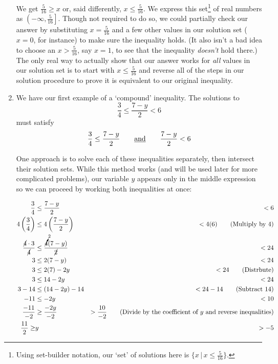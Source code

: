 \begin{ex}
\begin{enumerate}
We get $\frac{5}{16} \geq x$ or, said differently,  $x \leq \frac{5}{16}$.  We express this set\footnote{Using set-builder notation, our `set' of solutions here is $\{ x \, | \, x \leq \frac{5}{16} \}$.} of real numbers as  $\left(-\infty, \frac{5}{16}\right]$. Though not required to do so, we could partially check our answer by substituting $x = \frac{5}{16}$ and a few other values in our solution set ($x =0$, for instance) to make sure the inequality holds.  (It also isn't a bad idea to choose an $x > \frac{5}{16}$, say $x = 1$, to see that the inequality \textit{doesn't} hold there.)  The only real way to actually show that our answer works for \textit{all} values in our solution set is to start with $x \leq \frac{5}{16}$ and reverse all of the steps in our solution procedure to prove it is equivalent to our original inequality.  

\item  We have our first example of a `compound' inequality.  The solutions to  \[ \dfrac{3}{4} \leq \dfrac{7-y}{2} < 6 \] must satisfy \[ \dfrac{3}{4} \leq \dfrac{7-y}{2} \qquad \text{\underline{and}} \qquad \dfrac{7-y}{2} < 6\]

One approach is to solve each of these inequalities separately, then intersect their solution sets.  While this method works (and will be used later for more complicated problems), our variable $y$ appears only in the middle expression so we can proceed by working both inequalities at once:

\begin{align*}
\dfrac{3}{4} & \leq \dfrac{7-y}{2} & < 6 \\
4\left(\dfrac{3}{4} \right) & \leq 4\left( \dfrac{7-y}{2}\right) & < 4(6) \tag{Multiply by $4$} \\
\dfrac{\cancel{4} \cdot 3}{\cancel{4}}  & \leq \dfrac{\cancelto{2}{4}(7-y)}{\cancel{2}} &  < 24 \\
3 & \leq 2(7-y) & < 24 \\
3 & \leq 2(7)-2y & < 24 \tag{Distrbute}\\
3 & \leq 14-2y & < 24 \\
3 -14 & \leq (14-2y) - 14 & < 24 - 14 \tag{Subtract $14$} \\
-11 & \leq -2y & < 10 \\
\dfrac{-11}{-2} & \geq \dfrac{-2y}{-2} & > \dfrac{10}{-2} \tag{Divide by the coefficient of $y$ and reverse inequalities} \\
\dfrac{11}{2}  \geq & y & > -5 \\
\end{align*}


\end{enumerate}
\end{ex}
